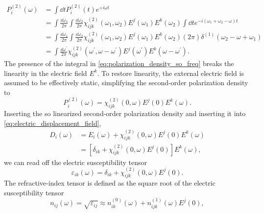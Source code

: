 \begin{equation}
	\begin{split}
		P_i^{(2)}(\omega)
		&=
		\int\dd{t}
		P_i^{(2)}(t)
		e^{+i\omega t}
		\\
		&=
		\int\frac{\dd{\omega_1}}{2\pi}
		\int\frac{\dd{\omega_2}}{2\pi}
		\chi^{(2)}_{ijk}(\omega_1,\omega_2)
		E^j(\omega_1)
		E^k(\omega_2)
		\int\dd{t}
		e^{-i(\omega_1+\omega_2-\omega)t}
		\\
		&=
		\int\frac{\dd{\omega_1}}{2\pi}
		\int\frac{\dd{\omega_2}}{2\pi}
		\chi^{(2)}_{ijk}(\omega_1,\omega_2)
		E^j(\omega_1)
		E^k(\omega_2)
		(2\pi)
		\delta^{(1)}(\omega_2-\omega+\omega_1)
		\\
		&=
		\int\frac{\dd{\omega^\prime}}{2\pi}
		\chi^{(2)}_{ijk}(\omega^\prime,\omega-\omega^\prime)
		E^j(\omega^\prime)
		E^k(\omega-\omega^\prime)
		.
	\end{split}
	\label{eq:polarization_density_so_freq}
\end{equation}
The presence of the integral in \cref{eq:polarization_density_so_freq} breaks the linearity in the electric field $E^k$.
To restore linearity, the external electric field is assumed to be effectively static, simplifying the second-order polarization density to~\cite[p.~495]{Boyd2020}
\begin{equation}
	P_i^{(2)}(\omega)
	=
	\chi^{(2)}_{ijk}(0,\omega)
	E^j(0)
	E^k(\omega)
	.
	\label{eq:polarization_density_so_freq_pockels}
\end{equation}
Inserting the so linearized second-order polarization density and inserting it into \cref{eq:electric_displacement_field},
\begin{equation}
	\begin{split}
		D_i(\omega)
		&=
		E_i(\omega)
		+
		\chi^{(2)}_{ijk}(0,\omega)
		E^j(0)
		E^k(\omega)
		\\
		&=
		\left[
			\delta_{ik}
			+
			\chi^{(2)}_{ijk}(0,\omega)
			E^j(0)
		\right]
		E^k(\omega)
		,
	\end{split}
\end{equation}
we can read off the electric susceptibility tensor
\begin{equation}
	\varepsilon_{ik}(\omega)
	=
	\delta_{ik}
	+
	\chi^{(2)}_{ijk}(0,\omega)
	E^j(0)
	.
\end{equation}
The refractive-index tensor is defined as the square root of the electric susceptibility tensor~\cite[p.~3]{Brooker2003}
\begin{equation}
	n_{ij}(\omega)
	=
	\sqrt{\varepsilon_{ij}}
	\approx
	n_{ik}^{(0)}(\omega)
	+
	n_{ijk}^{(1)}(\omega)
	E^j(0)
	,
	\label{eq:refractive_index_expansion}
\end{equation}
